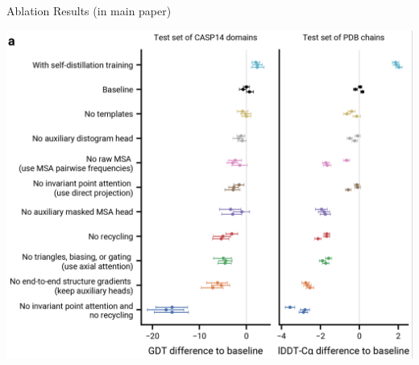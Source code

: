 \documentclass[presentation, smaller]{beamer}
\begin{document}
\begin{frame}[label={sec:org7b72ead}]{Ablation Results (in main paper) \cite{jumperHighlyAccurateProtein2021}}
\begin{center}
\includegraphics[height=0.9\textheight]{./imgs/ablation_results.png}
\end{center}
\end{frame}
\end{document}
